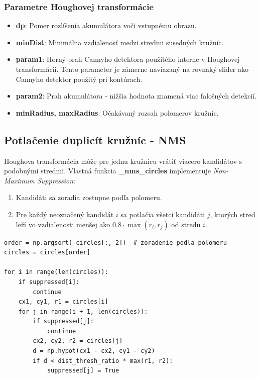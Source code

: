 \documentclass[a4paper, 12pt]{article}
\begin{document}
\subsubsection*{Parametre Houghovej transformácie}
\begin{itemize}
    \item \textbf{dp}: Pomer rozlíšenia akumulátora voči vstupnému obrazu.
    \item \textbf{minDist}: Minimálna vzdialenosť medzi stredmi susedných kružníc.
    \item \textbf{param1}: Horný prah Cannyho detektora použitého interne v Houghovej transformácii. Tento parameter je zámerne naviazaný na rovnaký slider ako Cannyho detektor použitý pri kontúrach.
    \item \textbf{param2}: Prah akumulátora - nižšia hodnota znamená viac falošných detekcií.
    \item \textbf{minRadius, maxRadius}: Očakávaný rozsah polomerov kružníc.
\end{itemize}

\subsection{Potlačenie duplicít kružníc - NMS}
Houghova transformácia môže pre jednu kružnicu vrátiť viacero kandidátov s podobnými stredmi. Vlastná funkcia \textbf{\_nms\_circles} implementuje \textit{Non-Maximum Suppression}:

\begin{enumerate}
    \item Kandidáti sa zoradia zostupne podľa polomeru.
    \item Pre každý neoznačený kandidát $i$ sa potlačia všetci kandidáti $j$, ktorých stred leží vo vzdialenosti menšej ako $0.8 \cdot \max(r_i, r_j)$ od stredu $i$.
\end{enumerate}

\begin{lstlisting}[caption={Core NMS algoritmu pre kružnice}]
order = np.argsort(-circles[:, 2])  # zoradenie podla polomeru
circles = circles[order]

for i in range(len(circles)):
    if suppressed[i]:
        continue
    cx1, cy1, r1 = circles[i]
    for j in range(i + 1, len(circles)):
        if suppressed[j]:
            continue
        cx2, cy2, r2 = circles[j]
        d = np.hypot(cx1 - cx2, cy1 - cy2)
        if d < dist_thresh_ratio * max(r1, r2):
            suppressed[j] = True
\end{lstlisting}
\end{document}
